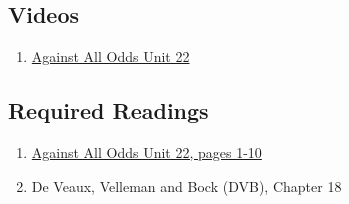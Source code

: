 \documentclass[letterpaper,9pt,twocolumn,twoside,printwatermark=false]{pinp}
\providecommand{\tightlist}{%
  \setlength{\itemsep}{0pt}\setlength{\parskip}{0pt}}
\begin{document}
\hypertarget{videos}{%
\subsection{Videos}\label{videos}}

\begin{enumerate}
\def\labelenumi{\arabic{enumi}.}
\tightlist
\item
  \href{https://www.learner.org/courses/againstallodds/unitpages/unit22.html}{Against
  All Odds Unit 22}
\end{enumerate}

\hypertarget{required-readings-1}{%
\subsection{Required Readings}\label{required-readings-1}}

\begin{enumerate}
\item \href{https://www.learner.org/courses/againstallodds/pdfs/AgainstAllOdds_StudentGuide_Unit22.pdf#page=1}{Against All Odds Unit 22, pages 1-10}
\item De Veaux, Velleman and Bock (DVB), Chapter 18

\end{enumerate}





\end{document}
